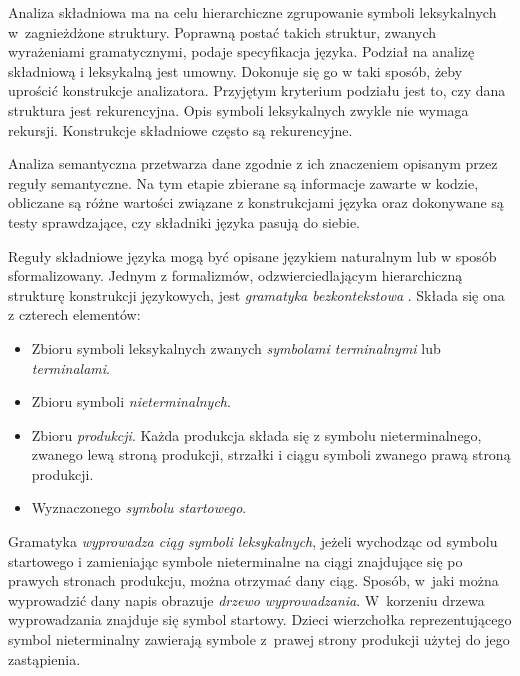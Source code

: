 Analiza składniowa ma na celu hierarchiczne zgrupowanie symboli leksykalnych 
w~zagnieżdżone struktury. Poprawną postać takich struktur, zwanych wyrażeniami gramatycznymi,
podaje specyfikacja języka. Podział na analizę składniową i leksykalną jest umowny.
Dokonuje się go w taki sposób, żeby uprościć konstrukcje analizatora. Przyjętym kryterium podziału
jest to, czy dana struktura jest rekurencyjna. Opis symboli leksykalnych zwykle nie wymaga rekursji.
Konstrukcje składniowe często są rekurencyjne.

Analiza semantyczna przetwarza dane zgodnie z ich znaczeniem opisanym przez reguły semantyczne.
Na tym etapie zbierane są informacje zawarte w kodzie, obliczane są różne wartości związane
z konstrukcjami języka oraz dokonywane są testy sprawdzające, czy składniki języka pasują do siebie.

Reguły składniowe języka mogą być opisane językiem naturalnym lub w sposób sformalizowany.
Jednym z formalizmów, odzwierciedlającym hierarchiczną strukturę konstrukcji językowych,
jest \emph{gramatyka bezkontekstowa} \cite{compilers}. Składa się ona z czterech elementów:

\begin{itemize}
\item Zbioru symboli leksykalnych zwanych \emph{symbolami terminalnymi} lub \emph{terminalami}.
\item Zbioru symboli \emph{nieterminalnych}.
\item Zbioru \emph{produkcji}. Każda produkcja składa się z symbolu nieterminalnego,
  zwanego lewą stroną produkcji, strzałki i ciągu symboli zwanego prawą stroną produkcji.
\item Wyznaczonego \emph{symbolu startowego}.
\end{itemize}

Gramatyka \emph{wyprowadza ciąg symboli leksykalnych}, jeżeli wychodząc 
od symbolu startowego i zamieniając symbole nieterminalne na ciągi znajdujące 
się po prawych stronach produkcju, można otrzymać dany ciąg. Sposób, w~jaki
można wyprowadzić dany napis obrazuje \emph{drzewo wyprowadzania}. W~korzeniu drzewa wyprowadzania
znajduje się symbol startowy. Dzieci wierzchołka reprezentującego symbol nieterminalny
zawierają symbole z~prawej strony produkcji użytej do jego zastąpienia.


